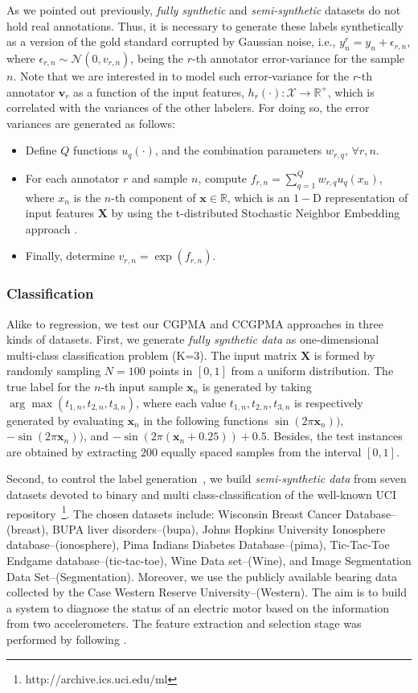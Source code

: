 \documentclass[journal]{IEEEtran}
\providecommand{\ve}[1]{{\bm{#1}}}%
\providecommand{\mat}[1]{{\bm{#1}}} %
\newcommand{\Real}{\mathbb{R}}
\providecommand{\ve}[1]{{\mathbf{#1}}}
\providecommand{\mat}[1]{{\mathbf{#1}}}
\newcommand{\boldv}{\mathbf{v}}
\newcommand{\boldx}{\mathbf{x}}
\newcommand{\boldX}{\mathbf{X}} %
\newcommand{\gauss}{\mathcal{N}} %
\begin{document}
As we pointed out previously, \textit{fully synthetic} and \textit{semi-synthetic} datasets do not hold real annotations. Thus, it is necessary to generate these labels synthetically as a version of the gold standard corrupted by Gaussian noise, i.e., $y_n^r = y_n +\epsilon_{r,n}$, where $\epsilon_{r,n}\sim \gauss(0, v_{r,n})$, being the $r$-th annotator error-variance for the sample $n$. Note that we are interested in to model such error-variance for the $r$-th annotator $\boldv_{r}$ as a function of the input features, $h_r(\cdot):\mathcal{X}\to \Real^{+}$, which is correlated with the variances of the other labelers. For doing so, the error variances are generated as follows:
\begin{itemize}
    \item Define $Q$ functions $u_q(\cdot)$, and the combination parameters $w_{r,q},\,\forall r, n$.
    \item For each annotator $r$ and sample $n$, compute $f_{r,n} = \sum_{q=1}^{Q}w_{r,q}u_q(x_n)$, where $x_n$ is the $n$-th component of $\ve{x}\in \Real$, which is an $1-$D representation of input features $\mat{X}$ by using the t-distributed Stochastic Neighbor Embedding approach \cite{maaten2008visualizing}.
    \item Finally, determine $v_{r,n} = \exp(f_{r,n})$. 
\end{itemize}

\subsubsection{Classification}\label{sec:datasetsCla}
Alike to regression, we test our CGPMA and CCGPMA approaches in three kinds of datasets. First, we generate \textit{fully synthetic data} as one-dimensional multi-class classification problem (K=3). The input matrix $\boldX$ is formed by randomly sampling $N=100$ points in $[0,1]$ from a uniform distribution. The true label for the $n$-th input sample $\boldx_n$ is generated by taking $\arg \max (t_{1,n}, t_{2,n}, t_{3,n})$, where each value $t_{1,n}, t_{2,n}, t_{3,n}$ is respectively generated by evaluating $\boldx_n$ in the following functions $\sin(2\pi\boldx_n))$, $-\sin(2\pi\boldx_n))$, and $-\sin(2\pi(\boldx_n+0.25))+0.5$. Besides, the test instances are obtained by extracting $200$ equally spaced samples from the interval $[0,1]$.

Second, to control the label generation~\cite{ruiz2019learning}, we build \textit{semi-synthetic data} from seven datasets devoted to binary and multi class-classification of the well-known {UCI repository}~\footnote{http://archive.ics.uci.edu/ml}.
The chosen datasets include: {Wisconsin Breast Cancer Database}--(breast), {BUPA liver disorders}--(bupa), {Johns Hopkins University Ionosphere database}--(ionosphere), {Pima Indians Diabetes Database}--(pima), {Tic-Tac-Toe Endgame database}--(tic-tac-toe), {Wine Data set}--(Wine), and {Image Segmentation Data Set}--(Segmentation). Moreover, we use the publicly available bearing data collected by the Case Western Reserve University--(Western). The aim is to build a system to diagnose the status of an electric motor based on the information from two accelerometers. The feature extraction and selection stage was performed by following \cite{hernandez2020bearing}.
\end{document}
